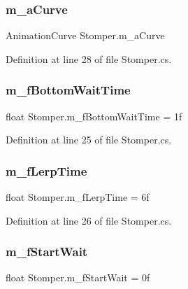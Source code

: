 \subsubsection{\texorpdfstring{m\+\_\+a\+Curve}{m\_aCurve}}
{\footnotesize\ttfamily Animation\+Curve Stomper.\+m\+\_\+a\+Curve}



Definition at line 28 of file Stomper.\+cs.

\mbox{\label{class_stomper_a742e053718f2ebe038939111ca82e145}} 
\subsubsection{\texorpdfstring{m\+\_\+f\+Bottom\+Wait\+Time}{m\_fBottomWaitTime}}
{\footnotesize\ttfamily float Stomper.\+m\+\_\+f\+Bottom\+Wait\+Time = 1f}



Definition at line 25 of file Stomper.\+cs.

\mbox{\label{class_stomper_aceefb2a1222aa344e4b9ccc27c039dcf}} 
\subsubsection{\texorpdfstring{m\+\_\+f\+Lerp\+Time}{m\_fLerpTime}}
{\footnotesize\ttfamily float Stomper.\+m\+\_\+f\+Lerp\+Time = 6f}



Definition at line 26 of file Stomper.\+cs.

\mbox{\label{class_stomper_a630b141381162d3d49fa54b6b5091367}} 
\subsubsection{\texorpdfstring{m\+\_\+f\+Start\+Wait}{m\_fStartWait}}
{\footnotesize\ttfamily float Stomper.\+m\+\_\+f\+Start\+Wait = 0f}



